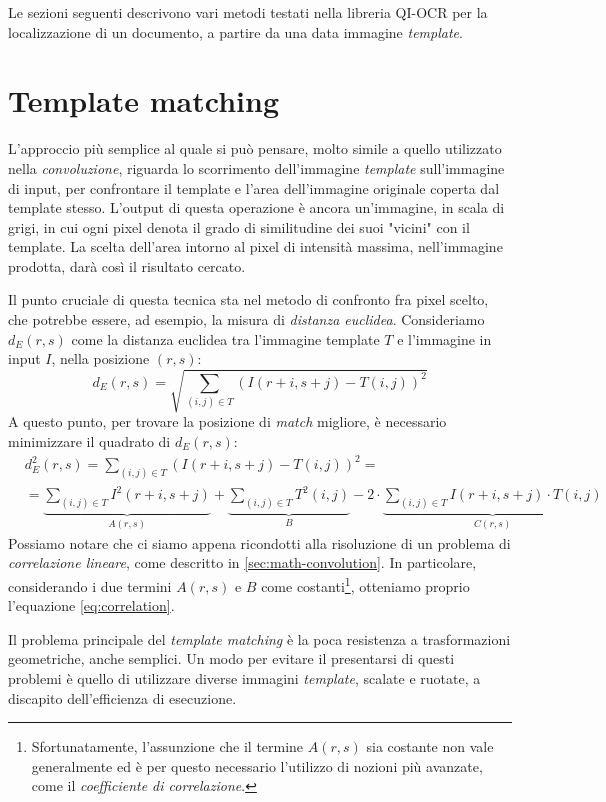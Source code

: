 Le sezioni seguenti descrivono vari metodi testati nella libreria QI-OCR per la localizzazione di un documento, a partire da una data immagine \textit{template}.


\section{Template matching}
L'approccio pi\`u semplice al quale si pu\`o pensare, molto simile a quello utilizzato nella \textit{convoluzione}, riguarda lo scorrimento dell'immagine \textit{template} sull'immagine di input, per confrontare il template e l'area dell'immagine originale coperta dal template stesso. L'output di questa operazione \`e ancora un'immagine, in scala di grigi, in cui ogni pixel denota il grado di similitudine dei suoi "vicini" con il template. La scelta dell'area intorno al pixel di intensit\`a massima, nell'immagine prodotta, dar\`a cos\`i il risultato cercato.\par
Il punto cruciale di questa tecnica sta nel metodo di confronto fra pixel scelto, che potrebbe essere, ad esempio, la misura di \textit{distanza euclidea}. Consideriamo $d_{E}(r, s)$ come la distanza euclidea tra l'immagine template $T$ e l'immagine in input $I$, nella posizione $(r, s)$:
\begin{equation}
	\label{eq:euclidean-distance}
	d_{E}(r, s) = \sqrt{\sum_{(i, j)\in T} (I(r + i, s + j) - T(i, j))^{2}}
\end{equation}
A questo punto, per trovare la posizione di \textit{match} migliore, \`e necessario minimizzare il quadrato di $d_{E}(r, s)$:
\begin{equation}
	\label{eq:euclidean-distance-squared}
	\begin{split}
		& d_{E}^{2}(r, s) = \sum_{(i, j)\in T} (I(r + i, s + j) - T(i, j))^{2} = \\
		& = \underbrace{\sum_{(i, j)\in T} I^{2}(r + i, s + j)}_{A(r,s)} + \underbrace{\sum_{(i, j)\in T} T^{2}(i, j)}_{B} - 2 \cdot \underbrace{\sum_{(i, j)\in T} I(r + i, s + j) \cdot T(i, j)}_{C(r,s)}  
	\end{split}
\end{equation}
Possiamo notare che ci siamo appena ricondotti alla risoluzione di un problema di \textit{correlazione lineare}, come descritto in \ref{sec:math-convolution}. In particolare, considerando i due termini $A(r,s)$ e $B$ come costanti\footnote{Sfortunatamente, l'assunzione che il termine $A(r,s)$ sia costante non vale generalmente ed \`e per questo necessario l'utilizzo di nozioni pi\`u avanzate, come il \textit{coefficiente di correlazione}.}, otteniamo proprio l'equazione \ref{eq:correlation}.\par
Il problema principale del \textit{template matching} \`e la poca resistenza a trasformazioni geometriche, anche semplici. Un modo per evitare il presentarsi di questi problemi \`e quello di utilizzare diverse immagini \textit{template}, scalate e ruotate, a discapito dell'efficienza di esecuzione.


